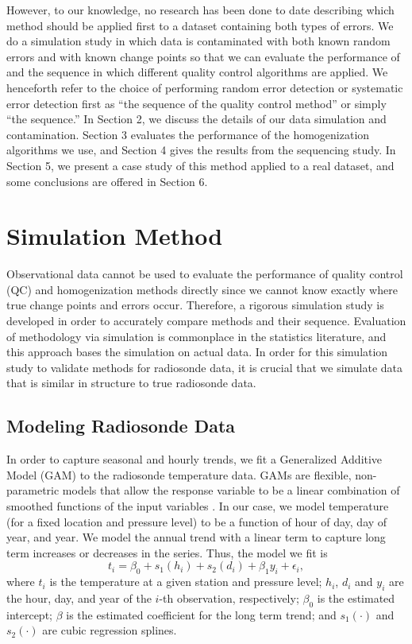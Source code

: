 \documentclass[12pt]{article}
\def\ni{\noindent}
\begin{document}
\begin{doublespacing}
However, to our knowledge, no research has been done to date describing which method should be applied first to a dataset containing both types of errors.  We do a simulation study in which data is contaminated with both known random errors and with known change points so that we can  evaluate the performance of and the sequence in which different quality control algorithms are applied.  We henceforth refer to the choice of performing random error detection or systematic error detection first  as ``the sequence of the quality control method'' or simply ``the sequence.''  In Section 2, we discuss the details of our data simulation and contamination.  Section 3 evaluates the performance of the homogenization algorithms we use, and Section 4 gives the results from the sequencing study.  In Section 5, we present a case study of this method applied to a real dataset, and some conclusions are offered in Section 6.

\section{Simulation Method}
Observational data cannot be used to evaluate the performance of quality control (QC) and homogenization methods directly since we cannot know exactly where true change points and errors occur.  Therefore, a rigorous simulation study is developed in order to accurately compare methods and their sequence.  Evaluation of methodology via simulation is commonplace in the statistics literature, and this approach bases the simulation on actual data.  In order for this simulation study to validate methods for radiosonde data, it is crucial that we simulate data that is similar in structure to true radiosonde data.

\subsection{Modeling Radiosonde Data}
\label{ssec:model}

In order to capture seasonal and hourly trends, we fit a Generalized Additive Model (GAM) to the radiosonde temperature data.  GAMs are flexible, non-parametric models that allow the response variable to be a linear combination of smoothed functions of the input variables \cite{hastie90}.  In our case, we model temperature (for a fixed location and pressure level) to be a function of hour of day, day of year, and year.  We model the annual trend with a linear term to capture long term increases or decreases in the series.  Thus, the model we fit is
\begin{equation} \label{eq:GAM}
	t_i = \beta_0 + s_1(h_i) + s_2(d_i) + \beta_1 y_i + \epsilon_i,
\end{equation}
\ni where $t_i$ is the temperature at a given station and pressure level; $h_i$, $d_i$ and $y_i$ are the hour, day, and year of the $i$-th observation, respectively; $\beta_0$ is the estimated intercept; $\beta$ is the estimated coefficient for the long term trend; and $s_1(\cdot)$ and $s_2(\cdot)$ are cubic regression splines.


\end{doublespacing}
\end{document}
